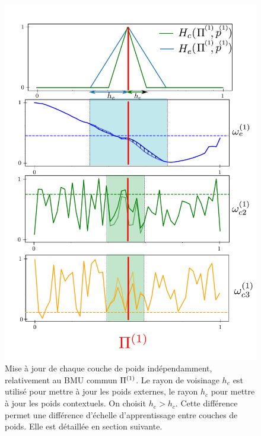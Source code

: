 \begin{figure}
\begin{minipage}[c]{0.5\textwidth}
\includegraphics[width=\textwidth]{maj_layers.pdf}
\end{minipage}
\hfill
\begin{minipage}[c]{0.4\textwidth}
\caption{Mise à jour de chaque couche de poids indépendamment, relativement au BMU commun $\Pi^{({1})}$. Le rayon de voisinage $h_e$ est utilisé pour mettre à jour les poids externes, le rayon $h_c$ pour mettre à jour les poids contextuels. On choisit $h_e > h_c$. Cette différence permet une différence d'échelle d'apprentissage entre couches de poids. Elle est détaillée en section suivante.}
\end{minipage}
\label{lig:maj}
\end{figure}

